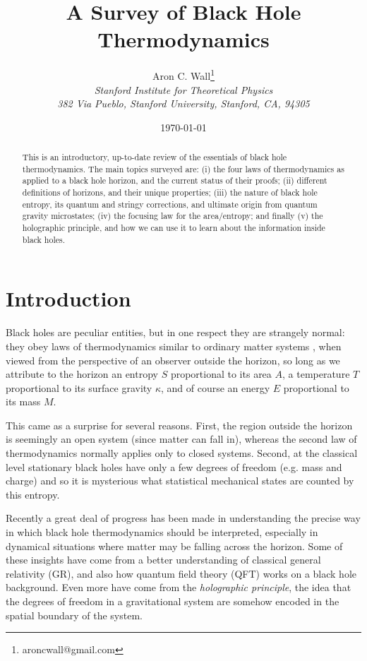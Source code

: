 \documentclass[12pt,a4paper]{article}
\date{\today}
\author{Aron C. Wall\footnote{aroncwall@gmail.com}
\\ \textit{Stanford Institute for Theoretical Physics}
\\ \textit{382 Via Pueblo, Stanford University, Stanford, CA, 94305} }
\title{A Survey of Black Hole Thermodynamics}
\begin{document}
\maketitle

\begin{abstract}
This is an introductory, up-to-date review of the essentials of black hole thermodynamics.  The main topics surveyed are: (i) the four laws of thermodynamics as applied to a black hole horizon, and the current status of their proofs; (ii) different definitions of horizons, and their unique properties; (iii) the nature of black hole entropy, its quantum and stringy corrections, and ultimate origin from quantum gravity microstates; (iv) the focusing law for the area/entropy; and finally (v) the holographic principle, and how we can use it to learn about the information inside black holes.
\end{abstract}

\begin{center}
\medskip\medskip\medskip
{}
\end{center}

\newpage
\tableofcontents

\section{Introduction}

Black holes are peculiar entities, but in one respect they are strangely normal: they obey laws of thermodynamics similar to ordinary matter systems \cite{bardeen1973four}, when viewed from the perspective of an observer outside the horizon, so long as we attribute to the horizon an entropy $S$ proportional to its area $A$, a temperature $T$ proportional to its surface gravity $\kappa$, and of course an energy $E$ proportional to its mass $M$.

This came as a surprise for several reasons.  First, the region outside the horizon is seemingly an open system (since matter can fall in), whereas the second law of thermodynamics normally applies only to closed systems.  Second, at the classical level stationary black holes have only a few degrees of freedom (e.g. mass and charge) and so it is mysterious what statistical mechanical states are counted by this entropy.

Recently a great deal of progress has been made in understanding the precise way in which black hole thermodynamics should be interpreted, especially in dynamical situations where matter may be falling across the horizon.  Some of these insights have come from a better understanding of classical general relativity (GR), and also how quantum field theory (QFT) works on a black hole background.  Even more have come from the \emph{holographic principle}, the idea that the degrees of freedom in a gravitational system are somehow encoded in the spatial boundary of the system.
\end{document}
